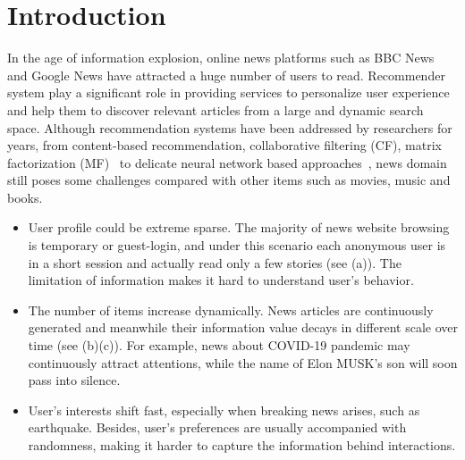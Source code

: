 \section{Introduction}
In the age of information explosion, online news platforms such as BBC News and Google News have attracted a huge number of users to read. Recommender system play a significant role in providing services to personalize user experience and help them to discover relevant articles from a large and dynamic search space. Although recommendation systems have been addressed by researchers for years, from content-based recommendation, collaborative filtering (CF), matrix factorization (MF)~\cite{rendle_factorization_2012} to delicate neural network based approaches~\cite{xin_cfm_2019}, news domain still poses some challenges compared with other items such as movies, music and books.
\begin{itemize}
    \item User profile could be extreme sparse. The majority of news website browsing is temporary or guest-login, and under this scenario each anonymous user is in a short session and actually read only a few stories (see (a)). The limitation of information makes it hard to understand user's behavior.
    \item The number of items increase dynamically. News articles are continuously generated and meanwhile their information value decays in different scale over time (see (b)(c)). For example, news about COVID-19 pandemic may continuously attract attentions, while the name of Elon MUSK's son will soon pass into silence.
    \item User's interests shift fast, especially when breaking news arises, such as earthquake. Besides, user's preferences are usually accompanied with randomness, making it harder to capture the information behind interactions.
\end{itemize}

